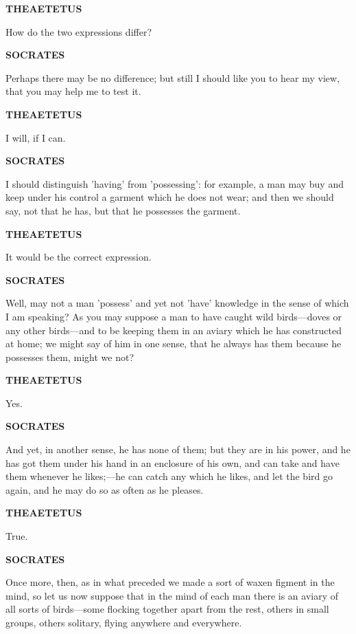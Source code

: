 \documentclass[11pt,letter]{article}
\begin{document}
\par \textbf{THEAETETUS}
\par   How do the two expressions differ?

\par \textbf{SOCRATES}
\par   Perhaps there may be no difference; but still I should like you to hear my view, that you may help me to test it.

\par \textbf{THEAETETUS}
\par   I will, if I can.

\par \textbf{SOCRATES}
\par   I should distinguish 'having' from 'possessing':  for example, a man may buy and keep under his control a garment which he does not wear; and then we should say, not that he has, but that he possesses the garment.

\par \textbf{THEAETETUS}
\par   It would be the correct expression.

\par \textbf{SOCRATES}
\par   Well, may not a man 'possess' and yet not 'have' knowledge in the sense of which I am speaking? As you may suppose a man to have caught wild birds—doves or any other birds—and to be keeping them in an aviary which he has constructed at home; we might say of him in one sense, that he always has them because he possesses them, might we not?

\par \textbf{THEAETETUS}
\par   Yes.

\par \textbf{SOCRATES}
\par   And yet, in another sense, he has none of them; but they are in his power, and he has got them under his hand in an enclosure of his own, and can take and have them whenever he likes;—he can catch any which he likes, and let the bird go again, and he may do so as often as he pleases.

\par \textbf{THEAETETUS}
\par   True.

\par \textbf{SOCRATES}
\par   Once more, then, as in what preceded we made a sort of waxen figment in the mind, so let us now suppose that in the mind of each man there is an aviary of all sorts of birds—some flocking together apart from the rest, others in small groups, others solitary, flying anywhere and everywhere.
\end{document}
